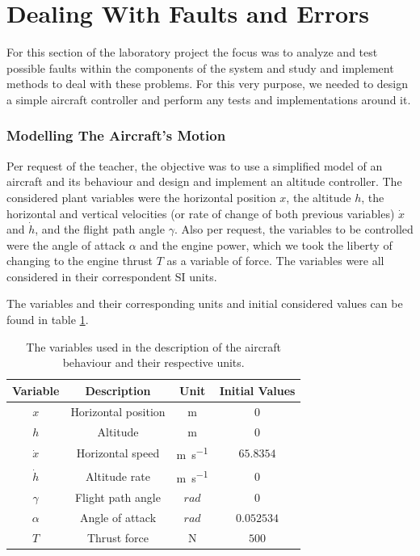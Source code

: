 \documentclass[english,palatino]{ist-report}
\begin{document}
\part{Dealing With Faults and Errors}

For this section of the laboratory project the focus was to analyze and test possible faults within the components of the system and study and implement methods to deal with these problems. For this very purpose, we needed to design a simple aircraft controller and perform any tests and implementations around it.

\section{Modelling The Aircraft's Motion}\label{sec:plant}

Per request of the teacher, the objective was to use a simplified model of an aircraft and its behaviour and design and implement an altitude controller. The considered plant variables were the horizontal position $x$, the altitude $h$, the horizontal and vertical velocities (or rate of change of both previous variables) $\dot{x}$ and $\dot{h}$, and the flight path angle $\gamma$. Also per request, the variables to be controlled were the angle of attack $\alpha$ and the engine power, which we took the liberty of changing to the engine thrust $T$ as a variable of force. The variables were all considered in their correspondent SI units.

The variables and their corresponding units and initial considered values can be found in table \ref{tab:controllervars}.
\begin{table}[ht]
	\centering
	\begin{tabular}{c|c|c|c}\toprule
		Variable		& Description			& Unit						& Initial Values	\\
		\midrule
		$x$				& Horizontal position	& \si{\meter}				& $0$				\\
		$h$				& Altitude				& \si{\meter}				& $0$				\\
		$\dot{x}$		& Horizontal speed		& \si{\meter\per\second}	& $65.8354$		   	\\
		$\dot{h}$		& Altitude rate			& \si{\meter\per\second}	& $0$				\\
		$\gamma$		& Flight path angle		& $rad$     				& $0$			    \\
		$\alpha$		& Angle of attack		& $rad$		        		& $0.052534$		\\
		$T$             & Thrust force          & \si{\newton}              & $500$                \\
		\bottomrule
	\end{tabular}
	\caption{The variables used in the description of the aircraft behaviour and their respective units.}
	\label{tab:controllervars}
\end{table}
\end{document}
